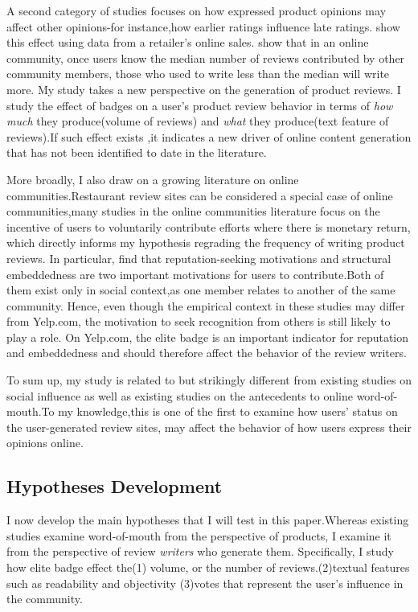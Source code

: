 \documentclass[12pt]{article}%
\begin{document}
A second category of studies focuses on how expressed product opinions may affect other opinions-for instance,how earlier ratings influence late ratings. \citep{moe2011value} show this effect using data from a retailer's online sales.\citep{chen2010social} show that in an online community, once users know the median number of reviews contributed by other community members, those who used to write less than the median will write more. My study takes a new perspective on the generation of product reviews. I study the effect of badges on a user's product review behavior in terms of \emph{how much} they produce(volume of reviews) and \emph{what} they produce(text feature of reviews).If such effect exists ,it indicates a new driver of online content generation that has not been identified to date in the literature. 

More broadly, I also draw on a growing literature on online communities\citep{butler2012cross,faraj2011network}.Restaurant review sites can be considered a special case of online communities,many studies in the online communities literature focus on the incentive of users to voluntarily contribute efforts where there is monetary return, which directly informs my hypothesis regrading the frequency of writing product reviews. In particular,\cite{wasko2005should} find that reputation-seeking motivations and structural embeddedness are two important motivations for users to contribute.Both of them exist only in social context,as one member relates to another of the same community. Hence, even though the empirical context in these studies may differ from Yelp.com, the motivation to seek recognition from others is still likely to play a role. On Yelp.com, the elite badge is an important indicator for reputation and embeddedness and should therefore affect the behavior of the review writers.

To sum up, my study is related to but strikingly different from existing studies on social influence as well as existing studies on the antecedents to online word-of-mouth.To my knowledge,this is one of the first to examine how users' status on the user-generated review sites, may affect the behavior of how users express their opinions online.


\subsection{Hypotheses Development}
I now develop the main hypotheses that I will test in this paper.Whereas existing studies examine word-of-mouth from the perspective of products, I examine it from the perspective of review \emph{writers} who generate them. Specifically, I study how elite badge effect the(1) volume, or the number of reviews.(2)textual features such as readability and objectivity (3)votes that represent the user's influence in the community.   
\end{document}
